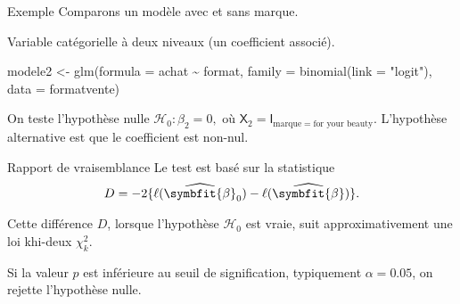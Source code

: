 \documentclass[
  ignorenonframetext,
]{beamer}
\newenvironment{Shaded}{\begin{snugshade}}{\end{snugshade}}
\newcommand{\AttributeTok}[1]{\textcolor[rgb]{0.40,0.45,0.13}{#1}}
\newcommand{\FunctionTok}[1]{\textcolor[rgb]{0.28,0.35,0.67}{#1}}
\newcommand{\NormalTok}[1]{\textcolor[rgb]{0.00,0.23,0.31}{#1}}
\newcommand{\OtherTok}[1]{\textcolor[rgb]{0.00,0.23,0.31}{#1}}
\newcommand{\SpecialCharTok}[1]{\textcolor[rgb]{0.37,0.37,0.37}{#1}}
\newcommand{\StringTok}[1]{\textcolor[rgb]{0.13,0.47,0.30}{#1}}
\renewcommand{\boldsymbol}[1]{\symbfit{#1}}
\begin{document}
\begin{frame}[fragile]{Exemple}
\protect{}\label{exemple}
Comparons un modèle avec et sans marque.

Variable catégorielle à deux niveaux (un coefficient associé).

\begin{Shaded}
\begin{Highlighting}[numbers=left,,]
\NormalTok{modele2 }\OtherTok{\textless{}{-}} \FunctionTok{glm}\NormalTok{(}\AttributeTok{formula =}\NormalTok{ achat }\SpecialCharTok{\textasciitilde{}}\NormalTok{ format,}
            \AttributeTok{family =} \FunctionTok{binomial}\NormalTok{(}\AttributeTok{link =} \StringTok{"logit"}\NormalTok{),}
            \AttributeTok{data =}\NormalTok{ formatvente)}
\end{Highlighting}
\end{Shaded}

On teste l'hypothèse nulle \(\mathscr{H}_0: \beta_{2} = 0,\) où
\(\mathsf{X}_2 = \mathsf{I}_{\mathrm{marque}=\text{for your beauty}}\).
L'hypothèse alternative est que le coefficient est non-nul.
\end{frame}

\begin{frame}{Rapport de vraisemblance}
\protect{}\label{rapport-de-vraisemblance}
Le test est basé sur la statistique \begin{align*}
 D = -2\{\ell(\widehat{\boldsymbol{\beta}}_0)-\ell(\widehat{\boldsymbol{\beta}})\}.
\end{align*}

Cette différence \(D\), lorsque l'hypothèse \(\mathscr{H}_0\) est vraie,
suit approximativement une loi khi-deux \(\chi^2_k\).

Si la valeur \(p\) est inférieure au seuil de signification, typiquement
\(\alpha = 0.05\), on rejette l'hypothèse nulle.
\end{frame}
\end{document}
